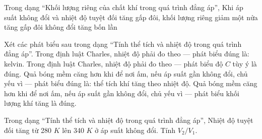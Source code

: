 \begin{ex}
Trong dạng “Khối lượng riêng của chất khí trong quá trình đẳng áp”, Khi áp suất không đổi và nhiệt độ tuyệt đối tăng gấp đôi, khối lượng riêng
\choice
{\True giảm một nửa}
{tăng gấp đôi}
{không đổi}
{tăng bốn lần}
\end{ex}

\begin{ex}
Xét các phát biểu sau trong dạng “Tính thể tích và nhiệt độ trong quá trình đẳng áp”.
\choiceTF
{\True Trong định luật Charles, nhiệt độ phải đo theo — phát biểu đúng là: kelvin.}
{Trong định luật Charles, nhiệt độ phải đo theo — phát biểu độ $C$ tùy ý là đúng.}
{\True Quả bóng mềm căng hơn khi để nơi ấm, nếu áp suất gần không đổi, chủ yếu vì — phát biểu đúng là: thể tích khí tăng theo nhiệt độ.}
{Quả bóng mềm căng hơn khi để nơi ấm, nếu áp suất gần không đổi, chủ yếu vì — phát biểu khối lượng khí tăng là đúng.}
\end{ex}

\begin{bt}
Trong dạng “Tính thể tích và nhiệt độ trong quá trình đẳng áp”, Nhiệt độ tuyệt đối tăng từ 280 $K$ lên 340 $K$ ở áp suất không đổi. Tính $V_2/V_1$.
\end{bt}

